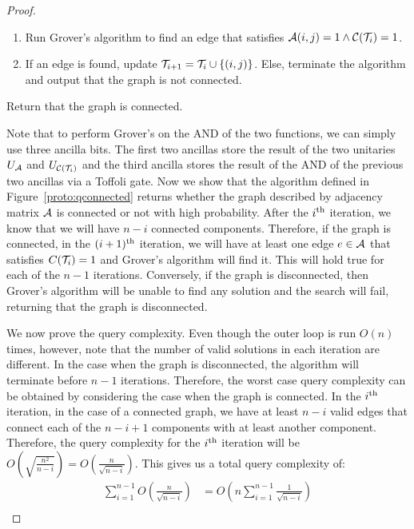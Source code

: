 \begin{solution}[label=ques:4b]
\begin{proof}[Proof]
{\begin{enumerate}
        \item Run Grover's algorithm to find an edge that satisfies $\mathcal{A}(i, j) = 1 \wedge \mathcal{C}(\mathcal{T}_i) = 1$.\par
        \item If an edge is found, update $\mathcal{T}_{i+1} = \mathcal{T}_i \cup \{(i, j)\}$. Else, terminate the algorithm and output that the graph is not connected.
      \end{enumerate}
      Return that the graph is connected.
    }
    Note that to perform Grover's on the AND of the two functions, we can simply use three ancilla bits. The first two ancillas store the result of the two unitaries $U_{\mathcal{A}}$ and $U_{\mathcal{C}(\mathcal{T}_i)}$ and the third ancilla stores the result of the AND of the previous two ancillas via a Toffoli gate. Now we show that the algorithm defined in Figure~\ref{proto:qconnected} returns whether the graph described by adjacency matrix $\mathcal{A}$ is connected or not with high probability. After the $i\textsuperscript{th}$ iteration, we know that we will have $n - i$ connected components. Therefore, if the graph is connected, in the $(i+1)\textsuperscript{th}$ iteration, we will have at least one edge $e\in\mathcal{A}$ that satisfies $C(\mathcal{T}_i) = 1$ and Grover's algorithm will find it. This will hold true for each of the $n-1$ iterations. Conversely, if the graph is disconnected, then Grover's algorithm will be unable to find any solution and the search will fail, returning that the graph is disconnected.\par
    We now prove the query complexity. Even though the outer loop is run $O(n)$ times, however, note that the number of valid solutions in each iteration are different. In the case when the graph is disconnected, the algorithm will terminate before $n - 1$ iterations. Therefore, the worst case query complexity can be obtained by considering the case when the graph is connected. In the $i\textsuperscript{th}$ iteration, in the case of a connected graph, we have at least $n - i$ valid edges that connect each of the $n - i + 1$ components with at least another component. Therefore, the query complexity for the $i\textsuperscript{th}$ iteration will be $O\left(\sqrt{\frac{n^2}{n - i}}\right) = O\left(\frac{n}{\sqrt{n - i}}\right)$. This gives us a total query complexity of:
    \begin{equation}
      \begin{split}
        \sum_{i=1}^{n-1} O\left(\frac{n}{\sqrt{n - i}}\right) &= O\left(n\sum_{i=1}^{n-1}\frac{1}{\sqrt{n - i}}\right)\\

\end{split}
\end{equation}
\end{proof}
\end{solution}
